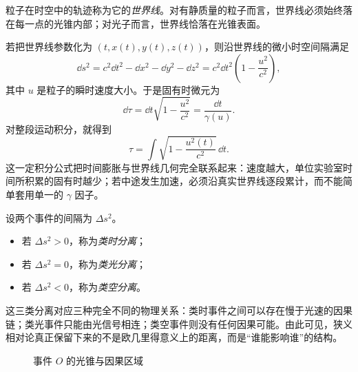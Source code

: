 \begin{definition}
粒子在时空中的轨迹称为它的\emph{世界线}。对有静质量的粒子而言，世界线必须始终落在每一点的光锥内部；对光子而言，世界线恰落在光锥表面。
\end{definition}

若把世界线参数化为 $(t,x(t),y(t),z(t))$，则沿世界线的微小时空间隔满足
\[
\dd s^2=c^2\dd t^2-\dd x^2-\dd y^2-\dd z^2
=c^2\dd t^2\left(1-\frac{u^2}{c^2}\right),
\]
其中 $u$ 是粒子的瞬时速度大小。于是固有时微元为
\[
\dd \tau=\dd t\sqrt{1-\frac{u^2}{c^2}}=\frac{\dd t}{\gamma(u)}.
\]
对整段运动积分，就得到
\[
\tau=\int \sqrt{1-\frac{u^2(t)}{c^2}}\,\dd t.
\]
这一定积分公式把时间膨胀与世界线几何完全联系起来：速度越大，单位实验室时间所积累的固有时越少；若中途发生加速，必须沿真实世界线逐段累计，而不能简单套用单一的 $\gamma$ 因子。

\begin{definition}
设两个事件的间隔为 $\Delta s^2$。
\begin{itemize}
  \item 若 $\Delta s^2>0$，称为\emph{类时分离}；
  \item 若 $\Delta s^2=0$，称为\emph{类光分离}；
  \item 若 $\Delta s^2<0$，称为\emph{类空分离}。
\end{itemize}
\end{definition}

这三类分离对应三种完全不同的物理关系：类时事件之间可以存在慢于光速的因果链；类光事件只能由光信号相连；类空事件则没有任何因果可能。由此可见，狭义相对论真正保留下来的不是欧几里得意义上的距离，而是“谁能影响谁”的结构。

\begin{figure}[H]
\centering
{}
\caption{事件 $O$ 的光锥与因果区域}
\end{figure}

